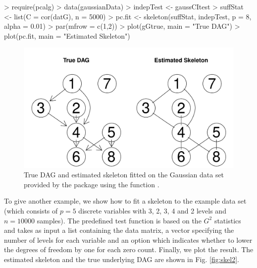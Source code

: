\documentclass[article]{jss}
\begin{document}
\begin{Schunk}
\begin{Sinput}
> require(pcalg)
> data(gaussianData)
> indepTest <- gaussCItest 
> suffStat <- list(C = cor(datG), n = 5000)
> pc.fit <- skeleton(suffStat, indepTest, p = 8, alpha = 0.01)
> par(mfrow = c(1,2))
> plot(gGtrue, main = "True DAG")
> plot(pc.fit, main = "Estimated Skeleton")
\end{Sinput}
\end{Schunk}
\begin{figure}
  \begin{center}
\includegraphics{pcalgDoc-skelExpl1Plot}
\caption{True DAG and estimated skeleton fitted on the Gaussian data set
  provided by the package using the function .}
\label{fig:skelExpl}
\end{center}
\end{figure}

To give another example, we show how to fit a skeleton to the example
data set  (which consists of $p=5$ discrete
variables with 3, 2, 3, 4 and 2 levels and $n=10000$ samples). The
predefined test function  is based on the $G^2$
statistics and takes as input a list containing the data matrix, a
vector specifying the number of levels for each variable and an option
which indicates whether to lower the degrees of freedom by one for
each zero count. Finally, we plot the result. The estimated skeleton
and the true underlying DAG are shown in Fig. \ref{fig:skel2}.
\end{document}
